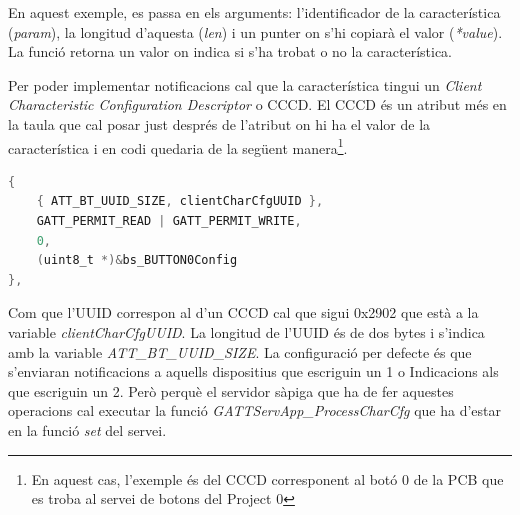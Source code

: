En aquest exemple, es passa en els arguments: l'identificador de la característica (\textit{param}), la longitud d'aquesta (\textit{len}) i un punter on s'hi copiarà el valor (\textit{*value}).
La funció retorna un valor on indica si s'ha trobat o no la característica.

Per poder implementar notificacions cal que la característica tingui un \textit{Client Characteristic Configuration Descriptor} o CCCD.
El CCCD és un atribut més en la taula que cal posar just després de l'atribut on hi ha el valor de la característica i en codi quedaria de la següent manera\footnote{En aquest cas, l'exemple és del CCCD corresponent al botó 0 de la PCB que es troba al servei de botons del Project 0}.
\newline
\newline
\begin{lstlisting}[language=C]
{
	{ ATT_BT_UUID_SIZE, clientCharCfgUUID },
	GATT_PERMIT_READ | GATT_PERMIT_WRITE,
	0,
	(uint8_t *)&bs_BUTTON0Config
},
\end{lstlisting}

Com que l'UUID correspon al d'un CCCD cal que sigui 0x2902 que està a la variable \textit{clientCharCfgUUID}.
La longitud de l'UUID és de dos bytes i s'indica amb la variable \textit{ATT\_BT\_UUID\_SIZE}.
La configuració per defecte és que s'enviaran notificacions a aquells dispositius que escriguin un 1 o Indicacions als que escriguin un 2.
Però perquè el servidor sàpiga que ha de fer aquestes operacions cal executar la funció \textit{GATTServApp\_ProcessCharCfg} que ha d'estar en la funció \textit{set} del servei.









